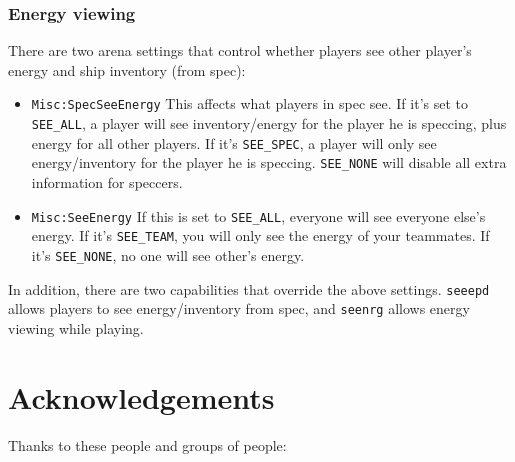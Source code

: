 \documentclass{article}
\begin{document}
\subsubsection{Energy viewing}

There are two arena settings that control whether players see other
player's energy and ship inventory (from spec):

\begin{itemize}

\item{\texttt{Misc:SpecSeeEnergy}} This affects what players in spec
see. If it's set to \verb/SEE_ALL/, a player will see inventory/energy
for the player he is speccing, plus energy for all other players. If
it's \verb/SEE_SPEC/, a player will only see energy/inventory for the
player he is speccing.  \verb/SEE_NONE/ will disable all extra
information for speccers.

\item{\texttt{Misc:SeeEnergy}} If this is set to \verb/SEE_ALL/,
everyone will see everyone else's energy.  If it's \verb/SEE_TEAM/, you
will only see the energy of your teammates. If it's \verb/SEE_NONE/, no
one will see other's energy.

\end{itemize}

In addition, there are two capabilities that override the above
settings. \verb/seeepd/ allows players to see energy/inventory from
spec, and \verb/seenrg/ allows energy viewing while playing.


\section{Acknowledgements}

Thanks to these people and groups of people:
\end{document}
